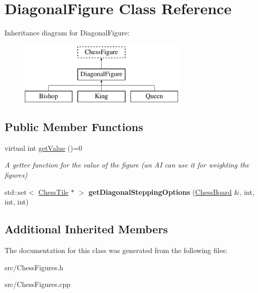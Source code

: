 \hypertarget{classDiagonalFigure}{}\section{Diagonal\+Figure Class Reference}
\label{classDiagonalFigure}
Inheritance diagram for Diagonal\+Figure\+:\begin{figure}[H]
\begin{center}
\leavevmode
\includegraphics[height=3.000000cm]{classDiagonalFigure}
\end{center}
\end{figure}
\subsection*{Public Member Functions}
\begin{DoxyCompactItemize}
\item 
\mbox{\label{classDiagonalFigure_a6fee4161066f638dda40b16d0096487d}} 
virtual int \mbox{\hyperlink{classDiagonalFigure_a6fee4161066f638dda40b16d0096487d}{get\+Value}} ()=0
\begin{DoxyCompactList}\small\item\em A getter function for the value of the figure (an AI can use it for weighting the figures) \end{DoxyCompactList}\item 
\mbox{\label{classDiagonalFigure_a95b5c28c86337d7d6b034aadd09c9d2b}} 
std\+::set$<$ \mbox{\hyperlink{classChessTile}{Chess\+Tile}} $\ast$ $>$ {\bfseries get\+Diagonal\+Stepping\+Options} (\mbox{\hyperlink{classChessBoard}{Chess\+Board}} \&, int, int, int)
\end{DoxyCompactItemize}
\subsection*{Additional Inherited Members}


The documentation for this class was generated from the following files\+:\begin{DoxyCompactItemize}
\item 
src/Chess\+Figures.\+h\item 
src/Chess\+Figures.\+cpp\end{DoxyCompactItemize}
